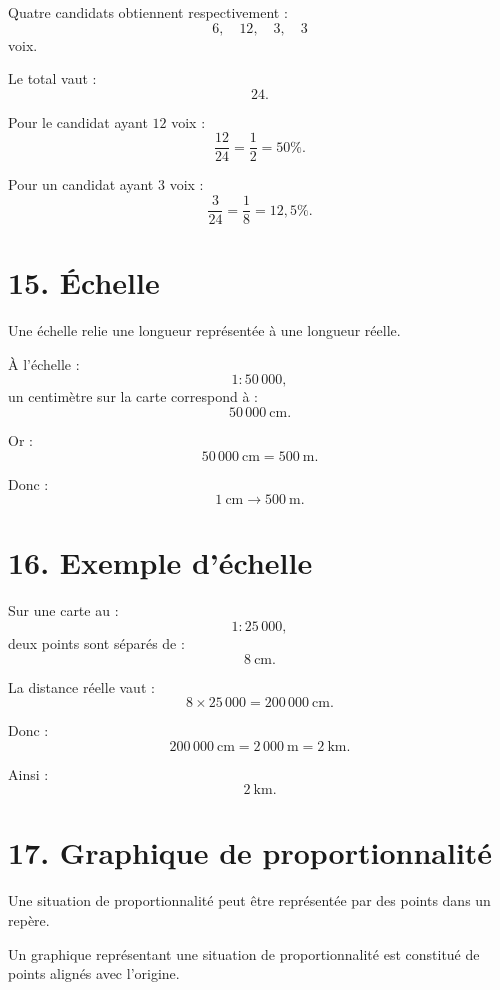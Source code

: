 Quatre candidats obtiennent respectivement :
\[
6,\quad12,\quad3,\quad3
\]
voix.

Le total vaut :
\[
24.
\]

Pour le candidat ayant $12$ voix :
\[
\dfrac{12}{24}=\dfrac12=50\%.
\]

Pour un candidat ayant $3$ voix :
\[
\dfrac3{24}=\dfrac18=12{,}5\%.
\]

\section{15. Échelle}

Une échelle relie une longueur représentée à une longueur réelle.

À l'échelle :
\[
1:50\,000,
\]
un centimètre sur la carte correspond à :
\[
50\,000\ \text{cm}.
\]

Or :
\[
50\,000\ \text{cm}=500\ \text{m}.
\]

Donc :
\[
1\ \text{cm}\longrightarrow500\ \text{m}.
\]

\section{16. Exemple d'échelle}

Sur une carte au :
\[
1:25\,000,
\]
deux points sont séparés de :
\[
8\ \text{cm}.
\]

La distance réelle vaut :
\[
8\times25\,000=200\,000\ \text{cm}.
\]

Donc :
\[
200\,000\ \text{cm}=2\,000\ \text{m}=2\ \text{km}.
\]

Ainsi :
\[
\boxed{2\ \text{km}}.
\]

\section{17. Graphique de proportionnalité}

Une situation de proportionnalité peut être représentée par des points dans un repère.


\begin{propriete}
Un graphique représentant une situation de proportionnalité est constitué de points alignés avec l'origine.
\end{propriete}

